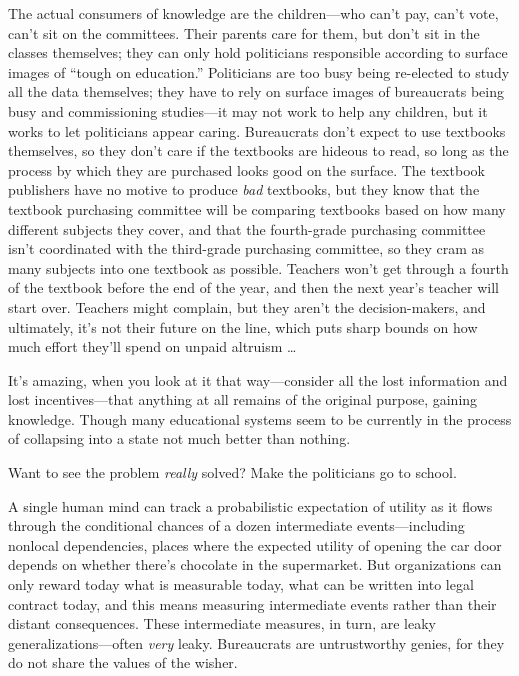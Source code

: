 {
 The actual consumers of knowledge are the children---who
can't pay, can't vote,
can't sit on the committees. Their parents care for
them, but don't sit in the classes themselves; they can
only hold politicians responsible according to surface images of
``tough on education.'' Politicians
are too busy being re-elected to study all the data themselves; they
have to rely on surface images of bureaucrats being busy and
commissioning studies---it may not work to help any children, but it
works to let politicians appear caring. Bureaucrats
don't expect to use textbooks themselves, so they
don't care if the textbooks are hideous to read, so
long as the process by which they are purchased looks good on the
surface. The textbook publishers have no motive to produce \textit{bad}
textbooks, but they know that the textbook purchasing committee will be
comparing textbooks based on how many different subjects they cover,
and that the fourth-grade purchasing committee isn't
coordinated with the third-grade purchasing committee, so they cram as
many subjects into one textbook as possible. Teachers
won't get through a fourth of the textbook before the
end of the year, and then the next year's teacher will
start over. Teachers might complain, but they aren't
the decision-makers, and ultimately, it's not their
future on the line, which puts sharp bounds on how much effort
they'll spend on unpaid altruism \ldots}

{
 It's amazing, when you look at it that
way---consider all the lost information and lost incentives---that
anything at all remains of the original purpose, gaining knowledge.
Though many educational systems seem to be currently in the process of
collapsing into a state not much better than nothing.}

{
 Want to see the problem \textit{really} solved? Make the
politicians go to school.}

{
 A single human mind can track a probabilistic expectation of
utility as it flows through the conditional chances of a dozen
intermediate events---including nonlocal dependencies, places where the
expected utility of opening the car door depends on whether
there's chocolate in the supermarket. But organizations
can only reward today what is measurable today, what can be written
into legal contract today, and this means measuring intermediate events
rather than their distant consequences. These intermediate measures, in
turn, are leaky generalizations---often \textit{very} leaky.
Bureaucrats are untrustworthy genies, for they do not share the values
of the wisher.}

